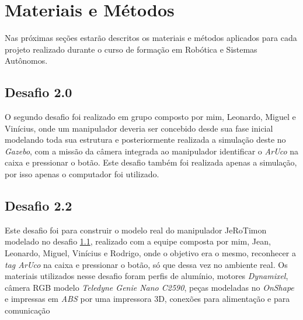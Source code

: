 \chapter{Materiais e Métodos}
\label{chap:mat}
Nas próximas seções estarão descritos os materiais e métodos aplicados para cada projeto realizado durante o curso de formação em Robótica e Sistemas Autônomos. 


\section{Desafio 2.0}
\label{sec:met_desafio2}
O segundo desafio foi realizado em grupo composto por mim, Leonardo, Miguel e Vinícius, onde um manipulador deveria ser concebido desde sua fase inicial modelando toda sua estrutura e posteriormente realizada a simulação deste no \textit{Gazebo}, com a missão da câmera integrada ao manipulador identificar o \textit{ArUco} na caixa e pressionar o botão. Este desafio também foi realizada apenas a simulação, por isso apenas o computador foi utilizado.  

\section{Desafio 2.2}
\label{sec:met_desafio2_2}
Este desafio foi para construir o modelo real do manipulador JeRoTimon modelado no desafio \ref{sec:met_desafio2}, realizado com a equipe composta por mim, Jean, Leonardo, Miguel, Vinícius e Rodrigo, onde o objetivo era o mesmo, reconhecer a \textit{tag ArUco} na caixa e pressionar o botão, só que dessa vez no ambiente real. Os materiais utilizados nesse desafio foram perfis de alumínio, motores \textit{Dynamixel}, câmera RGB modelo \textit{Teledyne Genie Nano C2590},  peças modeladas no \textit{OnShape} e impressas em \textit{ABS} por uma impressora 3D, conexões para alimentação e para comunicação

